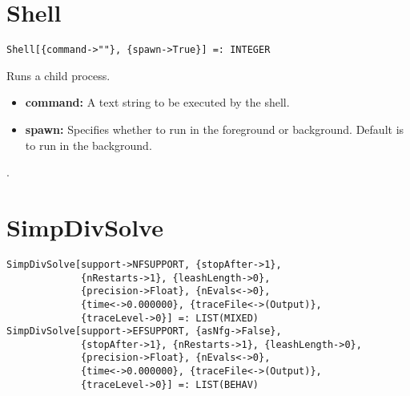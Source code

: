 
\section*{Shell}\label{PrimShell}
\begin{verbatim}
Shell[{command->""}, {spawn->True}] =: INTEGER 
\end{verbatim}

\noindent
Runs a child process.  
\begin{itemize}
\item \textbf{command:} A text string to be executed by the shell.  
\item \textbf{spawn:} Specifies whether to run in the foreground or
background.  Default is to run in the background.  
\end{itemize}

\seealso {}.


\section*{SimpDivSolve}\label{PrimSimpDivSolve}
\begin{verbatim}
SimpDivSolve[support->NFSUPPORT, {stopAfter->1}, 
             {nRestarts->1}, {leashLength->0}, 
             {precision->Float}, {nEvals<->0}, 
             {time<->0.000000}, {traceFile<->(Output)}, 
             {traceLevel->0}] =: LIST(MIXED) 
SimpDivSolve[support->EFSUPPORT, {asNfg->False}, 
             {stopAfter->1}, {nRestarts->1}, {leashLength->0}, 
             {precision->Float}, {nEvals<->0}, 
             {time<->0.000000}, {traceFile<->(Output)}, 
             {traceLevel->0}] =: LIST(BEHAV) 
\end{verbatim}

